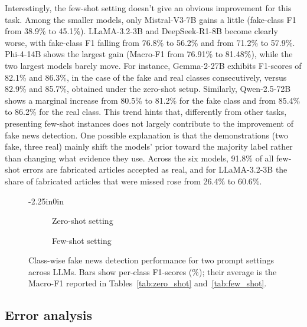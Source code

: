 \documentclass[10pt,letterpaper]{article}
\begin{document}
Interestingly, the few-shot setting doesn't give an obvious improvement for this task. Among the smaller models, only Mistral-V3-7B gains a little (fake-class F1 from 38.9\% to 45.1\%). LLaMA-3.2-3B and DeepSeek-R1-8B become clearly worse, with fake-class F1 falling from 76.8\% to 56.2\% and from 71.2\% to 57.9\%. Phi-4-14B shows the largest gain (Macro-F1 from 76.91\% to 81.48\%), while the two largest models barely move. For instance, Gemma-2-27B exhibits F1-scores of 82.1\% and 86.3\%, in the case of the fake and real classes consecutively, versus 82.9\% and 85.7\%, obtained under the zero-shot setup. Similarly, Qwen-2.5-72B shows a marginal increase from 80.5\% to 81.2\% for the fake class and from 85.4\% to 86.2\% for the real class. This trend hints that, differently from other tasks, presenting few-shot instances does not largely contribute to the improvement of fake news detection. One possible explanation is that the demonstrations (two fake, three real) mainly shift the models' prior toward the majority label rather than changing what evidence they use. Across the six models, 91.8\% of all few-shot errors are fabricated articles accepted as real, and for LLaMA-3.2-3B the share of fabricated articles that were missed rose from 26.4\% to 60.6\%.

\begin{figure}[t]
\begin{adjustwidth}{-2.25in}{0in}
    \centering
    \begin{subfigure}{0.7\textwidth}
        \centering
        \caption{Zero-shot setting}
        \label{fig:fake_zero}
    \end{subfigure}
    \hfill
    \begin{subfigure}{0.7\textwidth}
        \centering
        \caption{Few-shot setting}
        \label{fig:fake_few}
    \end{subfigure}
    \caption{Class-wise fake news detection performance for two prompt settings across LLMs. Bars show per-class F1-scores (\%); their average is the Macro-F1 reported in Tables~\ref{tab:zero_shot} and~\ref{tab:few_shot}.}
    \label{fig:fake_classwise}
\end{adjustwidth}
\end{figure}


\subsection*{Error analysis}
\end{document}
